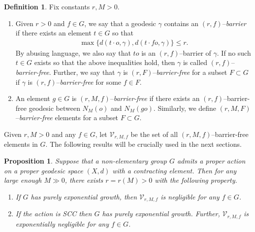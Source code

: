 \documentclass{amsart}
\newtheorem{prop}[thm]{Proposition}
\theoremstyle{definition}
\newtheorem{defn}[thm]{Definition}
\theoremstyle{remark}
\newcommand{\U}{ X}
\begin{document}
\begin{defn}\label{BarrierDef}
Fix constants $r,M>0$.
\begin{enumerate}
\item
Given $r>0$ and $f\in G$, we say that a geodesic $\gamma$ contains an $(r,f)$--\textit{barrier} if there exists an element $t\in G$ so that
    $$\begin{aligned} \label{eq:barrier}
    \max\{d(t\cdot o,\gamma),d(t\cdot fo,\gamma)\}\leq r.
    \end{aligned}$$
    By abusing language, we also say that $to$ is an $(r,f)$--{barrier} of $\gamma$.
    If no such $t\in G$ exists so that the above inequalities hold, then $\gamma$ is called $(r,f)$--\textit{barrier-free}. 
    Further, we say that $\gamma$ is  $(r,F)$--\textit{barrier-free} for a subset $F\subset G$ if $\gamma$ is  $(r,f)$--\textit{barrier-free} for some $f\in F$. 
 


\item
An element $g\in G$ is $(r,M,f)$--\textit{barrier-free} if there exists an $(r,f)$--barrier-free geodesic between $N_M(o)$ and $N_M(go)$. Similarly, we define $(r,M,F)$--\textit{barrier-free} elements for a subset $F\subset G$.
\end{enumerate}
\end{defn}




Given $r,M>0$ and  any $f\in G$, let $\mathcal{V}_{r,M,f}$ be the set of all $(r,M,f)$--barrier-free elements in $G$. The following results will be crucially used in the next sections. %

\begin{prop}\label{pro:growthtight}\cite[Theorems B \& C]{YANG10}
Suppose that a non-elementary group $G$ admits a proper action on a proper geodesic space $(\U,d)$ with a contracting element.   Then for any large enough $M\gg 0$, there exists $r=r(M)>0$ with the following property.
\begin{enumerate}
\item  
If $G$ has purely exponential growth,  then $\mathcal{V}_{r,M,f}$ is  {negligible} for any $f\in G$.

\item If the action is SCC then $G$ has purely exponential growth. Further,  $\mathcal{V}_{r,M,f}$ is exponentially negligible for any $f\in G$.

\end{enumerate}
\end{prop}  
\end{document}
